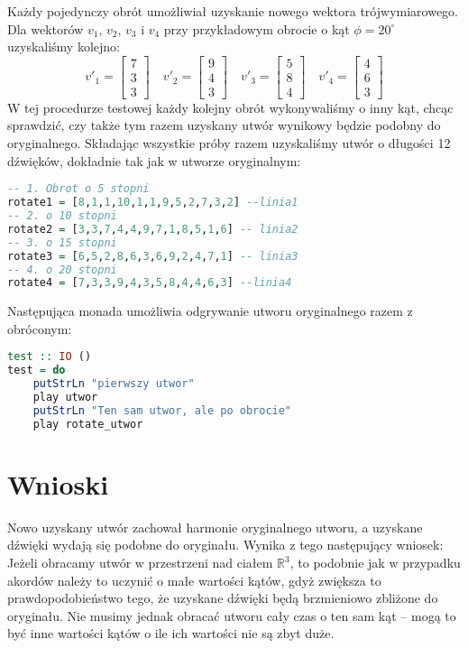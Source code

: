 Każdy pojedynczy obrót umożliwiał uzyskanie nowego wektora trójwymiarowego. Dla wektorów $v_{1}$, $v_{2}$, $v_{3}$ i $v_{4}$ przy przykładowym obrocie o kąt $\phi = 20^{\circ}$ uzyskaliśmy kolejno:
\begin{equation*}
v'_{1} =
\begin{bmatrix}
7 \\
3 \\
3
\end{bmatrix}
\quad
v'_{2} =
\begin{bmatrix}
9 \\
4 \\
3
\end{bmatrix}
\quad
v'_{3} =
\begin{bmatrix}
5 \\
8 \\
4
\end{bmatrix}
\quad
v'_{4} =
\begin{bmatrix}
4 \\
6 \\
3
\end{bmatrix}
\end{equation*}
W tej procedurze testowej każdy kolejny obrót wykonywaliśmy o inny kąt, chcąc sprawdzić, czy także tym razem uzyskany utwór wynikowy będzie podobny do oryginalnego.
Składając wszystkie próby razem uzyskaliśmy utwór o długości 12 dźwięków, dokładnie tak jak w utworze oryginalnym:
\begin{lstlisting}[language = Haskell]
-- 1. Obrot o 5 stopni
rotate1 = [8,1,1,10,1,1,9,5,2,7,3,2] --linia1
-- 2. o 10 stopni
rotate2 = [3,3,7,4,4,9,7,1,8,5,1,6] -- linia2
-- 3. o 15 stopni
rotate3 = [6,5,2,8,6,3,6,9,2,4,7,1] -- linia3
-- 4. o 20 stopni 
rotate4 = [7,3,3,9,4,3,5,8,4,4,6,3] --linia4
\end{lstlisting}

Następująca monada umożliwia odgrywanie utworu oryginalnego razem z obróconym:
\begin{lstlisting}[language = Haskell]
test :: IO ()
test = do
    putStrLn "pierwszy utwor" 
    play utwor
    putStrLn "Ten sam utwor, ale po obrocie"
    play rotate_utwor
\end{lstlisting}

\section{Wnioski}
Nowo uzyskany utwór zachował harmonie oryginalnego utworu, a uzyskane dźwięki wydają się podobne do oryginału. Wynika z tego następujący wniosek: Jeżeli obracamy utwór w przestrzeni nad ciałem $\mathbb{R}^{3}$, to podobnie jak w przypadku akordów należy to uczynić o małe wartości kątów, gdyż zwiększa to prawdopodobieństwo tego, że uzyskane dźwięki będą brzmieniowo zbliżone do oryginału. Nie musimy jednak  obracać utworu cały czas o ten sam kąt -- mogą to być inne wartości kątów o ile ich wartości nie są zbyt duże.